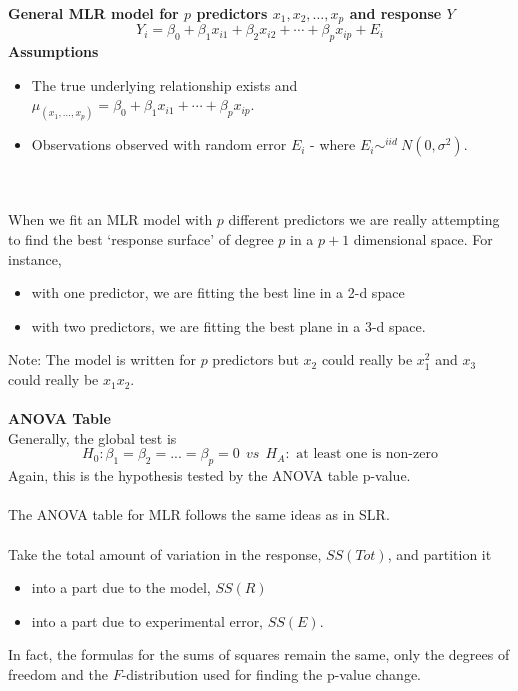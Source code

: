 \Large\textbf{General MLR model for $p$ predictors $x_1, x_2,\ldots, x_p$ and response $Y$}\large\\
$$ Y_i = \beta_0 + \beta_1 x_{i1} + \beta_2 x_{i2} + \cdots + \beta_p x_{ip} + E_i$$
\textbf{Assumptions} 
\begin{itemize}
\item The true underlying relationship exists and $\mu_(x_1,...,x_p)=\beta_0 + \beta_1 x_{i1} + \cdots+\beta_p x_{ip}$.
\item Observations observed with random error $E_i$ - where $E_i\sim^{iid}~N(0,\sigma^2)$.
\end{itemize}
~\\~\\
When we fit an MLR model with $p$ different predictors we are really attempting to find the best `response surface' of degree $p$ in a $p+1$ dimensional space.  For instance,
\begin{itemize}  
\item with one predictor, we are fitting the best line in a 2-d space
\item with two predictors, we are fitting the best plane in a 3-d space.
\end{itemize}

Note: The model is written for $p$ predictors but $x_2$ could really be $x_1^2$ and $x_3$ could really be $x_1x_2$.\\~\\

\textbf{ANOVA Table}\\
Generally, the global test is
$$H_0: \beta_1=\beta_2=...=\beta_p=0 ~~vs~~H_A: \text{ at least one is non-zero}$$
Again, this is the hypothesis tested by the ANOVA table p-value.\\~\\

The ANOVA table for MLR follows the same ideas as in SLR.  \\~\\
Take the total amount of variation in the response, $SS(Tot)$, and partition it
\begin{itemize}
\item into a part due to the model, $SS(R)$
\item into a part due to experimental error, $SS(E)$.
\end{itemize}
In fact, the formulas for the sums of squares remain the same, only the degrees of freedom and the $F$-distribution used for finding the p-value change.\\~\\

